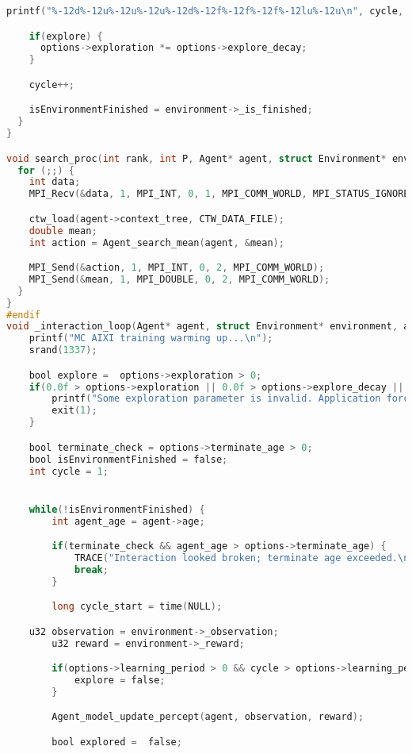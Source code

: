 \documentclass[fancychapters]{report}   	%
\begin{document}
\begin{lstlisting}[language=C,caption={main.c}]
    printf("%-12d%-12u%-12u%-12u%-12d%-12f%-12f%-12f%-12lu%-12u\n", cycle, observation, reward, action, explored, options->exploration, agent->total_reward, Agent_average_reward(agent), ticks_taken, ctw_size(agent->context_tree));

    if(explore) {
      options->exploration *= options->explore_decay;
    }

    cycle++;

    isEnvironmentFinished = environment->_is_finished;
  }
}

void search_proc(int rank, int P, Agent* agent, struct Environment* environment, app_options* options) {
  for (;;) {
    int data;
    MPI_Recv(&data, 1, MPI_INT, 0, 1, MPI_COMM_WORLD, MPI_STATUS_IGNORE);

    ctw_load(agent->context_tree, CTW_DATA_FILE);
    double mean;
    int action = Agent_search_mean(agent, &mean);

    MPI_Send(&action, 1, MPI_INT, 0, 2, MPI_COMM_WORLD);
    MPI_Send(&mean, 1, MPI_DOUBLE, 0, 2, MPI_COMM_WORLD);
  }
}
#endif
void _interaction_loop(Agent* agent, struct Environment* environment, app_options* options) {
    printf("MC AIXI training warming up...\n");
    srand(1337);

    bool explore =  options->exploration > 0;
    if(0.0f > options->exploration || 0.0f > options->explore_decay || options->explore_decay > 1.0f) {
        printf("Some exploration parameter is invalid. Application force quitting.\n");
        exit(1);
    }

    bool terminate_check = options->terminate_age > 0;
    bool isEnvironmentFinished = false;
    int cycle = 1;


    while(!isEnvironmentFinished) {
        int agent_age = agent->age;

        if(terminate_check && agent_age > options->terminate_age) {
            TRACE("Interaction looked broken; terminate age exceeded.\n", "main");
            break;
        }

        long cycle_start = time(NULL);

	u32 observation = environment->_observation;
        u32 reward = environment->_reward;

        if(options->learning_period > 0 && cycle > options->learning_period) {
            explore = false;
        }

        Agent_model_update_percept(agent, observation, reward);

        bool explored =  false;


\end{lstlisting}
\end{document}
